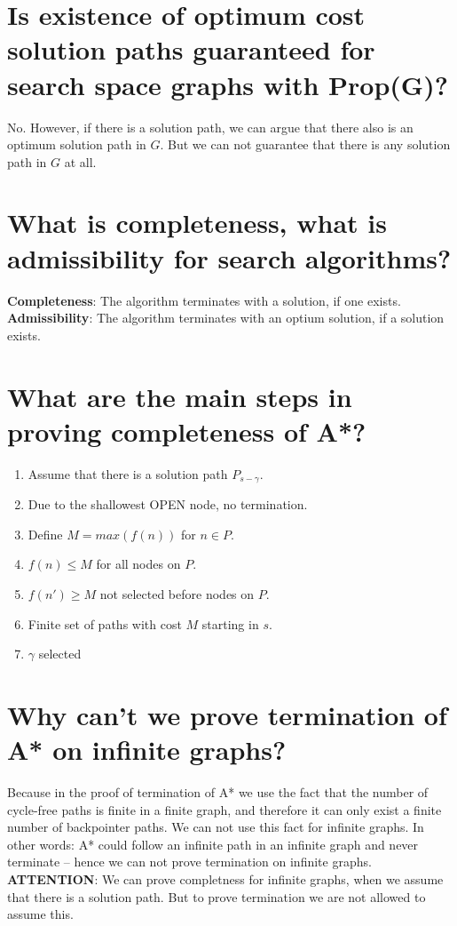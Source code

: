 \documentclass[12pt, a4paper]{article}
\begin{document}
\section{Is existence of optimum cost solution paths guaranteed for search space graphs with Prop(G)?}
No. However, if there is a solution path, we can argue that there also is an optimum solution path in $G$. But we can not guarantee that there is any solution path in $G$ at all.

\section{What is completeness, what is admissibility for search algorithms?}
\textbf{Completeness}: The algorithm terminates with a solution, if one exists. \\
\textbf{Admissibility}: The algorithm terminates with an optium solution, if a solution exists.

\section{What are the main steps in proving completeness of A*?}
\begin{enumerate}
\item Assume that there is a solution path $P_{s-\gamma}$.
\item Due to the shallowest OPEN node, no termination.
\item Define $M = max(f(n))$ for $n \in P$.
\item $f(n) \leq M$ for all nodes on $P$.
\item $f(n') \geq M$ not selected before nodes on $P$.
\item Finite set of paths with cost $M$ starting in $s$.
\item $\gamma$ selected
\end{enumerate}

\section{Why can’t we prove termination of A* on infinite graphs?}
Because in the proof of termination of A* we use the fact that the number of cycle-free paths is finite in a finite graph, and therefore it can only exist a finite number of backpointer paths. We can not use this fact for infinite graphs. In other words: A* could follow an infinite path in an infinite graph and never terminate – hence we can not prove termination on infinite graphs. \\
\textbf{ATTENTION}: We can prove completness for infinite graphs, when we assume that there is a solution path. But to prove termination we are not allowed to assume this.
\end{document}

